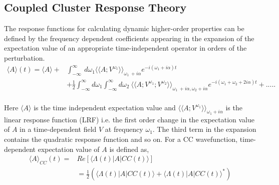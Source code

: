 \subsection{Coupled Cluster Response Theory}
The response functions for calculating dynamic higher-order properties 
can be defined by the frequency dependent coefficients appearing in the 
expansion of the expectation value of an appropriate time-independent 
operator in orders of the perturbation.\cite{koch90}
\\
\begin{equation}
\begin{split}
\langle A \rangle (t) = \langle A \rangle + & \int_{-\infty}^{\infty}\
d\omega_1{\langle\langle A;V^{\omega_1}\rangle\rangle}_{\omega_1  \
+ i\alpha}e^{-i(\omega_1 + i\alpha)t} \\
& + \frac{1}{2} \int_{-\infty}^{\infty}d\omega_1\int_{-\infty}^{\infty}d\omega_2\
{\langle\langle A;V^{\omega_1};V^{\omega_2}\rangle\rangle}_{\omega_1 \
+ i\alpha,\omega_2 + i\alpha}e^{-i(\omega_1 + \omega_2 + 2i\alpha)t} + .....
\end{split}
\end{equation}
\\
Here $\langle A \rangle$ is the time independent expectation value and
${\langle\langle A;V^{\omega_1}\rangle\rangle}_{\omega_1 + i\alpha}$
is the linear response function (LRF) i.e. the first order change in the expectation value of 
$A$ in a time-dependent field $V$ at frequency $\omega_1$. The third term in the expansion
contains the quadratic response function and so on. For a CC wavefunction, time-dependent 
expectation value of $A$ is defined as\cite{revisited},
\\
\begin{equation}
\begin{split}
{\langle A \rangle}_{CC} (t) = & Re [\langle \Lambda(t) | A | CC(t)\rangle ]\\
& = \frac{1}{2} (\langle \Lambda(t) | A | CC(t)\rangle  + {\langle \Lambda(t) | A | CC(t)\rangle}^{*})
\end{split}
\end{equation}
